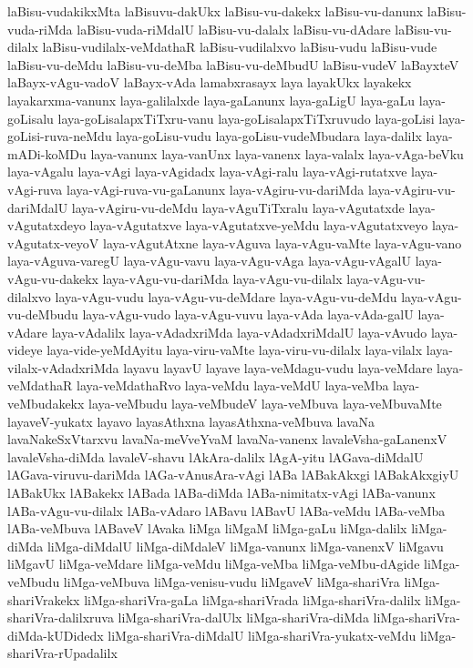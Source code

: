 {laBisu-vudakikxMta
laBisuvu-dakUkx
laBisu-vu-dakekx
laBisu-vu-danunx
laBisu-vuda-riMda
laBisu-vuda-riMdalU
laBisu-vu-dalalx
laBisu-vu-dAdare
laBisu-vu-dilalx
laBisu-vudilalx-veMdathaR
laBisu-vudilalxvo
laBisu-vudu
laBisu-vude
laBisu-vu-deMdu
laBisu-vu-deMba
laBisu-vu-deMbudU
laBisu-vudeV
laBayxteV
laBayx-vAgu-vadoV
laBayx-vAda
lamabxrasayx
laya
layakUkx
layakekx
layakarxma-vanunx
laya-galilalxde
laya-gaLanunx
laya-gaLigU
laya-gaLu
laya-goLisalu
laya-goLisalapxTiTxru-vanu
laya-goLisalapxTiTxruvudo
laya-goLisi
laya-goLisi-ruva-neMdu
laya-goLisu-vudu
laya-goLisu-vudeMbudara
laya-dalilx
laya-mADi-koMDu
laya-vanunx
laya-vanUnx
laya-vanenx
laya-valalx
laya-vAga-beVku
laya-vAgalu
laya-vAgi
laya-vAgidadx
laya-vAgi-ralu
laya-vAgi-rutatxve
laya-vAgi-ruva
laya-vAgi-ruva-vu-gaLanunx
laya-vAgiru-vu-dariMda
laya-vAgiru-vu-dariMdalU
laya-vAgiru-vu-deMdu
laya-vAguTiTxralu
laya-vAgutatxde
laya-vAgutatxdeyo
laya-vAgutatxve
laya-vAgutatxve-yeMdu
laya-vAgutatxveyo
laya-vAgutatx-veyoV
laya-vAgutAtxne
laya-vAguva
laya-vAgu-vaMte
laya-vAgu-vano
laya-vAguva-varegU
laya-vAgu-vavu
laya-vAgu-vAga
laya-vAgu-vAgalU
laya-vAgu-vu-dakekx
laya-vAgu-vu-dariMda
laya-vAgu-vu-dilalx
laya-vAgu-vu-dilalxvo
laya-vAgu-vudu
laya-vAgu-vu-deMdare
laya-vAgu-vu-deMdu
laya-vAgu-vu-deMbudu
laya-vAgu-vudo
laya-vAgu-vuvu
laya-vAda
laya-vAda-galU
laya-vAdare
laya-vAdalilx
laya-vAdadxriMda
laya-vAdadxriMdalU
laya-vAvudo
laya-videye
laya-vide-yeMdAyitu
laya-viru-vaMte
laya-viru-vu-dilalx
laya-vilalx
laya-vilalx-vAdadxriMda
layavu
layavU
layave
laya-veMdagu-vudu
laya-veMdare
laya-veMdathaR
laya-veMdathaRvo
laya-veMdu
laya-veMdU
laya-veMba
laya-veMbudakekx
laya-veMbudu
laya-veMbudeV
laya-veMbuva
laya-veMbuvaMte
layaveV-yukatx
layavo
layasAthxna
layasAthxna-veMbuva
lavaNa
lavaNakeSxVtarxvu
lavaNa-meVveYvaM
lavaNa-vanenx
lavaleVsha-gaLanenxV
lavaleVsha-diMda
lavaleV-shavu
lAkAra-dalilx
lAgA-yitu
lAGava-diMdalU
lAGava-viruvu-dariMda
lAGa-vAnusAra-vAgi
lABa
lABakAkxgi
lABakAkxgiyU
lABakUkx
lABakekx
lABada
lABa-diMda
lABa-nimitatx-vAgi
lABa-vanunx
lABa-vAgu-vu-dilalx
lABa-vAdaro
lABavu
lABavU
lABa-veMdu
lABa-veMba
lABa-veMbuva
lABaveV
lAvaka
liMga
liMgaM
liMga-gaLu
liMga-dalilx
liMga-diMda
liMga-diMdalU
liMga-diMdaleV
liMga-vanunx
liMga-vanenxV
liMgavu
liMgavU
liMga-veMdare
liMga-veMdu
liMga-veMba
liMga-veMbu-dAgide
liMga-veMbudu
liMga-veMbuva
liMga-venisu-vudu
liMgaveV
liMga-shariVra
liMga-shariVrakekx
liMga-shariVra-gaLa
liMga-shariVrada
liMga-shariVra-dalilx
liMga-shariVra-dalilxruva
liMga-shariVra-dalUlx
liMga-shariVra-diMda
liMga-shariVra-diMda-kUDidedx
liMga-shariVra-diMdalU
liMga-shariVra-yukatx-veMdu
liMga-shariVra-rUpadalilx
}
